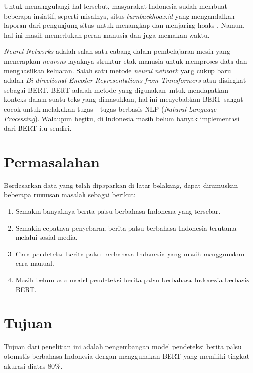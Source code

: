 Untuk menanggulangi hal tersebut, masyarakat Indonesia sudah membuat beberapa insiatif, seperti misalnya, situs \textit{turnbackhoax.id} yang mengandalkan laporan dari pengunjung situs untuk menangkap dan menjaring hoaks \cite{turnbackhoax_works}. Namun, hal ini masih memerlukan peran manusia  dan juga memakan waktu.

\textit{Neural Networks} adalah salah satu cabang dalam pembelajaran mesin yang menerapkan \textit{neurons} layaknya struktur otak manusia untuk memproses data dan menghasilkan keluaran. Salah satu metode \textit{neural network} yang cukup baru adalah \textit{Bi-directional Encoder Representations from Transformers} atau disingkat sebagai BERT. BERT adalah metode yang digunakan untuk mendapatkan konteks dalam suatu teks yang dimasukkan, hal ini menyebabkan BERT sangat cocok untuk melakukan tugas - tugas berbasis NLP (\textit{Natural Language Processing}). Walaupun begitu, di Indonesia masih belum banyak implementasi dari BERT itu sendiri.

\section{Permasalahan}
\label{sec:permasalahan}

Berdasarkan data yang telah dipaparkan di latar belakang, dapat dirumuskan beberapa rumusan masalah sebagai berikut:

\begin{enumerate}[itemsep=-0.2em]
      \item Semakin banyaknya berita palsu berbahasa Indonesia yang tersebar.

      \item Semakin cepatnya penyebaran berita palsu berbahasa Indonesia terutama melalui sosial media.

      \item Cara pendeteksi berita palsu berbahasa Indonesia yang masih menggunakan cara manual.

      \item Masih belum ada model pendeteksi berita palsu berbahasa Indonesia berbasis BERT.

\end{enumerate}

\section{Tujuan}
\label{sec:Tujuan}

Tujuan dari penelitian ini adalah pengembangan model pendeteksi berita palsu otomatis berbahasa Indonesia dengan menggunakan BERT yang memiliki tingkat akurasi diatas 80\%.

